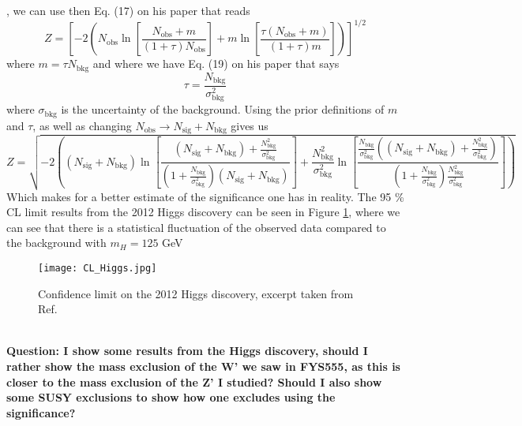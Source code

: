 \documentclass[12pt, a4paper]{book}
\begin{document}
\cite{Cowan_Uncertainty_in_sig}, we can use then Eq. (17) on his paper that reads
$$
Z = \left[-2\left(N_{\text{obs}}\ln\left[\frac{N_{\text{obs}}+m}{(1+\tau)N_{\text{obs}}}\right] + m\ln\left[\frac{\tau(N_{\text{obs}}+m)}{(1+\tau)m}\right]\right)\right]^{1/2}
$$
where $m=\tau N_{\text{bkg}}$ and where we have Eq. (19) on his paper that says
$$
\tau=\frac{N_{\text{bkg}}}{\sigma_{\text{bkg}}^2}
$$
where $\sigma_{\text{bkg}}$ is the uncertainty of the background. Using the prior definitions of $m$ and $\tau$, as well as changing $N_{\text{obs}} \rightarrow N_{\text{sig}}+N_{\text{bkg}}$ gives us
\begin{equation}\label{eq:significance}
    \textstyle    Z = \sqrt{-2\left((N_{\text{sig}}+N_{\text{bkg}})\ln\left[\frac{(N_{\text{sig}}+N_{\text{bkg}})+\frac{N_{\text{bkg}}^2}{\sigma_{\text{bkg}}^2} }{(1+\frac{N_{\text{bkg}}}{\sigma_{\text{bkg}}^2})(N_{\text{sig}}+N_{\text{bkg}})}\right] + \frac{N_{\text{bkg}}^2}{\sigma_{\text{bkg}}^2} \ln\left[\frac{\frac{N_{\text{bkg}}}{\sigma_{\text{bkg}}^2}((N_{\text{sig}}+N_{\text{bkg}})+\frac{N_{\text{bkg}}^2}{\sigma_{\text{bkg}}^2} )}{(1+\frac{N_{\text{bkg}}}{\sigma_{\text{bkg}}^2})\frac{N_{\text{bkg}}^2}{\sigma_{\text{bkg}}^2}}\right]\right)}
\end{equation}
Which makes for a better estimate of the significance one has in reality.
\newpage\noindent The 95 \% CL limit results from the 2012 Higgs discovery \cite{Higgs_discovery_2012} can be seen in Figure \ref{fig:HIGGS_CL}, where we can see that there is a statistical fluctuation of the observed data compared to the background with $m_H=125$ GeV
\begin{figure}[!ht]
	\centering
    \texttt{[image: CL\_Higgs.jpg]}
    \caption[Confidence Limit on the Higgs discovery]{Confidence limit on the 2012 Higgs discovery, excerpt taken from Ref. \cite{Higgs_discovery_2012}}\label{fig:HIGGS_CL}
\end{figure}
\\\textbf{Question: I show some results from the Higgs discovery, should I rather show the mass exclusion of the W' we saw in FYS555, as this is closer to the mass exclusion of the Z' I studied? Should I also show some SUSY exclusions to show how one excludes using the significance?}

\clearpage
\end{document}
